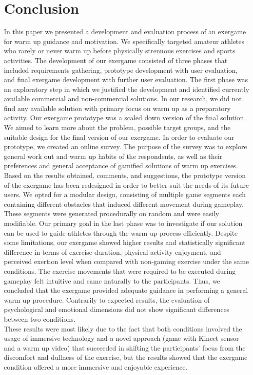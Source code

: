 \chapter{Conclusion}
\label{chap:conclusion}
In this paper we presented a development and evaluation process of an exergame for warm up guidance and motivation. We specifically targeted amateur athletes who rarely or never warm up before physically strenuous exercises and sports activities. The development of our exergame consisted of three phases that included requirements gathering, prototype development with user evaluation, and final exergame development with further user evaluation. The first phase was an exploratory step in which we justified the development and identified currently available commercial and non-commercial solutions. In our research, we did not find any available solution with primary focus on warm up as a preparatory activity. Our exergame prototype was a scaled down version of the final solution. We aimed to learn more about the problem,  possible target groups, and the suitable design for the final version of our exergame. In order to evaluate our prototype, we created an online survey. The purpose of the survey was to explore general work out and warm up habits of the respondents, as well as their preferences and general acceptance of gamified solutions of warm up exercises.  Based on the results obtained, comments, and suggestions, the prototype version of the exergame has been redesigned in order to better suit the needs of its future users. We opted for a modular design, consisting of multiple game segments each containing different obstacles that induced different movement during gameplay. These segments were generated procedurally on random and were easily modifiable. Our primary goal in the last phase was to investigate if our solution can be used to guide athletes through the warm up process efficiently. Despite some limitations, our exergame showed higher results and statistically significant difference in terms of exercise duration, physical activity enjoyment, and perceived exertion level when compared with non-gaming exercise under the same conditions. The exercise movements that were required to be executed during gameplay felt intuitive and came naturally to the participants. Thus, we concluded that the exergame provided adequate guidance in performing a general warm up procedure. Contrarily to expected results, the evaluation of psychological and emotional dimensions  did not show significant differences between two conditions.\\ These results were most likely due to the fact that both conditions involved the usage of immersive technology and a novel approach (game with Kinect sensor and a warm up video) that succeeded in shifting the participants' focus from the discomfort and dullness of the exercise, but the results showed that the exergame condition offered a more immersive and enjoyable experience.\\\\
